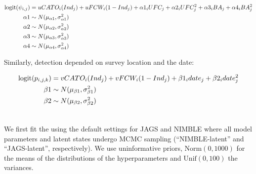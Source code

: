 \documentclass[12pt]{article}
\begin{document}
\begin{equation}
  \begin{split}
    \label{eq:multispecies}
    \mathrm{logit}(\psi_{i,j}) &= uCATO_i(Ind_j) + uFCW_i(1-Ind_j) +
    \alpha1_iUFC_j + \alpha2_iUFC^2_j + \alpha3_iBA_j +
    \alpha4_iBA^2_j \\
     \alpha1 &\sim N({\mu}_{\alpha1}, \sigma^2_{\alpha1})\\
     \alpha2 &\sim N({\mu}_{\alpha2}, \sigma^2_{\alpha2})\\
     \alpha3 &\sim N({\mu}_{\alpha3}, \sigma^2_{\alpha3})\\
     \alpha4 &\sim N({\mu}_{\alpha4}, \sigma^2_{\alpha4})
   \hspace{0.2em}
  \end{split}
\end{equation}

Similarly, detection depended on survey location and the date:

\begin{equation}
  \begin{split}
    \label{eq:multispecies_detection}
    \mathrm{logit}(p_{i,j,k}) &= vCATO_i(Ind_j) + vFCW_i(1-Ind_j) +
    \beta1_idate_j + \beta2_idate^2_j\\
     \beta1 &\sim N({\mu}_{\beta1}, \sigma^2_{\beta1})\\
     \beta2 &\sim N({\mu}_{\beta2}, \sigma^2_{\beta2})\\
    \hspace{0.2em}
  \end{split}
\end{equation}

We first fit the using the default settings for JAGS and NIMBLE where
all model parameters and latent states undergo MCMC sampling
(``NIMBLE-latent'' and ``JAGS-latent'', respectively). We use
uninformative priors, $\mathrm{Norm}(0,1000)$ for the means of the
distributions of the hyperparameters and $\mathrm{Unif}(0,100)$ the
variances.
\end{document}
